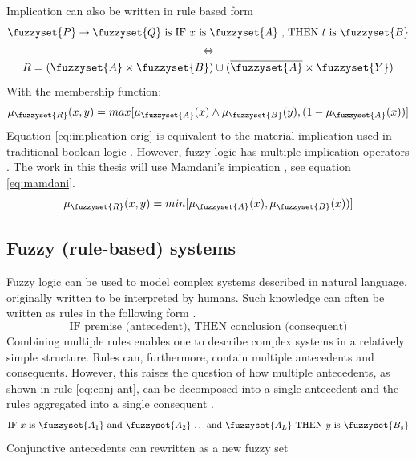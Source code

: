 \noindent Implication can also be written in rule based form
\[ \fuzzyset{P} \to \fuzzyset{Q} \text{ is  IF } x \text{ is } \fuzzyset{A} \text{ , THEN } t \text{ is } \fuzzyset{B}\]
\[ \Leftrightarrow \]
\[  R=(\fuzzyset{A}\times\fuzzyset{B})\cup (\overline{\fuzzyset{A}}\times \fuzzyset{Y})\]
\noindent With the membership function:
\begin{equation}
    \mu_{\fuzzyset{R}}(x,y)=max[\mu_{\fuzzyset{A}}(x)\land\mu_{\fuzzyset{B}}(y),(1-\mu_{\fuzzyset{A}}(x))]
    \label{eq:implication-orig}
\end{equation}
Equation \ref{eq:implication-orig} is equivalent to the material implication used in traditional boolean logic \cite{ying2002implication}. However, fuzzy logic has multiple implication operators \cite{ross2009fuzzy}. The work in this thesis will use Mamdani's impication , see equation \ref{eq:mamdani}.
\begin{equation}
    \mu_{\fuzzyset{R}}(x,y)=min[\mu_{\fuzzyset{A}}(x),\mu_{\fuzzyset{B}}(x))]
    \label{eq:mamdani}
\end{equation}




\subsection{Fuzzy (rule-based) systems}
Fuzzy logic can be used to model complex systems described in natural language, originally written to be interpreted by humans. Such knowledge can often be written as rules in the following form \cite{ross2009fuzzy}.
\begin{equation}
    \text{IF premise (antecedent), THEN conclusion (consequent)}
\end{equation}
Combining multiple rules enables one to describe complex systems in a relatively simple structure. Rules can, furthermore, contain multiple antecedents and consequents. However, this raises the question of how multiple antecedents, as shown in rule \ref{eq:conj-ant}, can be  decomposed into a single antecedent and the rules aggregated into a single consequent \cite{ross2009fuzzy}.
\begin{equation}
    \text {IF $x$ is $\fuzzyset{A_1}$ and $\fuzzyset{A_2}$ \dots and $\fuzzyset{A_L}$ THEN $y$ is $\fuzzyset{B_s}$}
    \label{eq:conj-ant}
\end{equation}
Conjunctive antecedents can rewritten as a new fuzzy set

